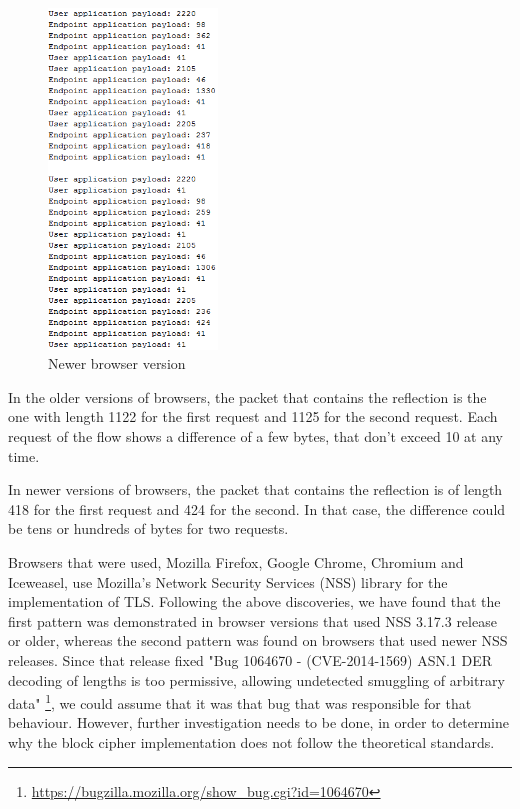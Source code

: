 \begin{figure}[H] \caption{Newer browser version} \centering
\includegraphics[width=0.4\textwidth]{diagrams/newer_browser_version.png}\end{figure}

In the older versions of browsers, the packet that contains the reflection is
the one with length 1122 for the first request and 1125 for the second request.
Each request of the flow shows a difference of a few bytes, that don't exceed 10
at any time.

In newer versions of browsers, the packet that contains the reflection is of
length 418 for the first request and 424 for the second. In that case, the
difference could be tens or hundreds of bytes for two requests.

Browsers that were used, Mozilla Firefox, Google Chrome, Chromium and Iceweasel,
use Mozilla's Network Security Services (NSS) library for the implementation of
TLS. Following the above discoveries, we have found that the first pattern was
demonstrated in browser versions that used NSS 3.17.3 release or older, whereas
the second pattern was found on browsers that used newer NSS releases. Since
that release fixed "Bug 1064670 - (CVE-2014-1569) ASN.1 DER decoding of lengths
is too permissive, allowing undetected smuggling of arbitrary data"
\footnote{\url{https://bugzilla.mozilla.org/show_bug.cgi?id=1064670}}, we could
assume that it was that bug that was responsible for that behaviour. However,
further investigation needs to be done, in order to determine why the block
cipher implementation does not follow the theoretical standards.

